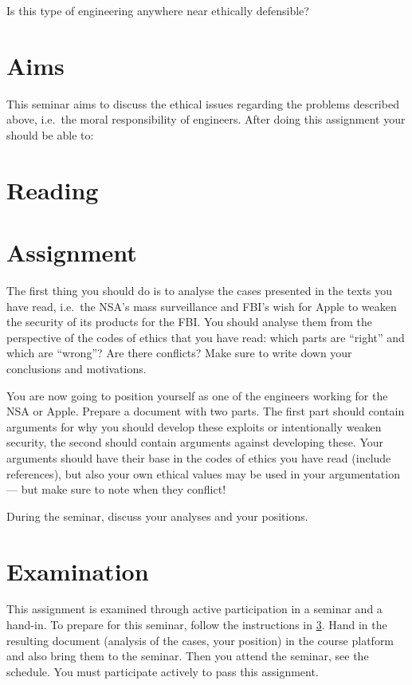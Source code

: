 \documentclass{llncs}
\begin{document}
Is this type of engineering anywhere near ethically defensible?


\section{Aims}

This seminar aims to discuss the ethical issues regarding the problems 
described above, i.e.\ the moral responsibility of engineers.
After doing this assignment your should be able to:
\begin{itemize}
	
\end{itemize}


\section{Reading}
\label{sec:Reading}



\section{Assignment}
\label{sec:Tasks}
The first thing you should do is to analyse the cases presented in the texts 
you have read, i.e.\ the NSA's mass surveillance and FBI's wish for Apple to 
weaken the security of its products for the FBI\@.
You should analyse them from the perspective of the codes of ethics that you 
have read: which parts are \enquote{right} and which are \enquote{wrong}?
Are there conflicts?
Make sure to write down your conclusions and motivations.

You are now going to position yourself as one of the engineers working for the 
NSA or Apple.
Prepare a document with two parts.
The first part should contain arguments for why you should develop these 
exploits or intentionally weaken security, the second should contain arguments 
against developing these.
Your arguments should have their base in the codes of ethics you have read 
(include references), but also your own ethical values may be used in your 
argumentation --- but make sure to note when they conflict!

During the seminar, discuss your analyses and your positions.


\section{Examination}
\label{sec:Examination}
This assignment is examined through active participation in a seminar and 
a hand-in.
To prepare for this seminar, follow the instructions in \cref{sec:Tasks}.
Hand in the resulting document (analysis of the cases, your position) in the 
course platform and also bring them to the seminar.
Then you attend the seminar, see the schedule.
You must participate actively to pass this assignment.


\printbibliography{}
\end{document}
